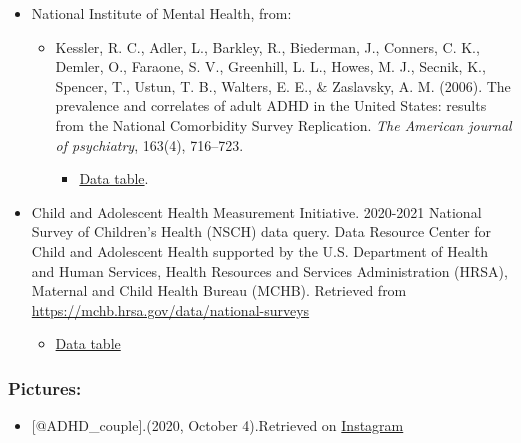 \documentclass[
]{article}
\providecommand{\tightlist}{%
  \setlength{\itemsep}{0pt}\setlength{\parskip}{0pt}}
\begin{document}
\begin{itemize}
\tightlist
\item
  National Institute of Mental Health, from:

  \begin{itemize}
  \tightlist
  \item
    Kessler, R. C., Adler, L., Barkley, R., Biederman, J., Conners, C.
    K., Demler, O., Faraone, S. V., Greenhill, L. L., Howes, M. J.,
    Secnik, K., Spencer, T., Ustun, T. B., Walters, E. E., \& Zaslavsky,
    A. M. (2006). The prevalence and correlates of adult ADHD in the
    United States: results from the National Comorbidity Survey
    Replication. \emph{The American journal of psychiatry}, 163(4),
    716--723.

    \begin{itemize}
    \tightlist
    \item
      \href{https://www.nimh.nih.gov/health/statistics/attention-deficit-hyperactivity-disorder-adhd\#part_2553}{Data
      table}.
    \end{itemize}
  \end{itemize}
\item
  Child and Adolescent Health Measurement Initiative. 2020-2021 National
  Survey of Children's Health (NSCH) data query. Data Resource Center
  for Child and Adolescent Health supported by the U.S. Department of
  Health and Human Services, Health Resources and Services
  Administration (HRSA), Maternal and Child Health Bureau (MCHB).
  Retrieved from \url{https://mchb.hrsa.gov/data/national-surveys}

  \begin{itemize}
  \tightlist
  \item
    \href{https://www.childhealthdata.org/browse/survey/allstates?q=9343\&g=1008\&a=18062\#}{Data
    table}
  \end{itemize}
\end{itemize}

\hypertarget{pictures}{%
\subsubsection{Pictures:}\label{pictures}}

\begin{itemize}
\tightlist
\item
  {[}@ADHD\_couple{]}.(2020, October 4).Retrieved on
  \href{https://www.instagram.com/p/CF7aB2NDL3j/?hl=f}{Instagram}
\end{itemize}
\end{document}

